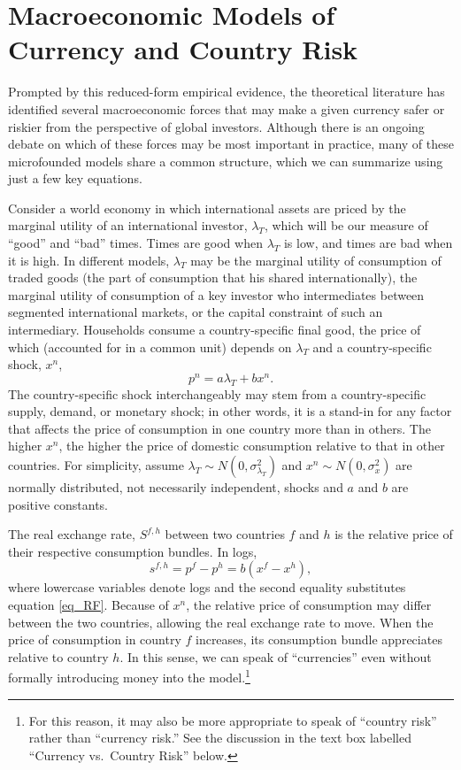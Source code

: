 \documentclass{ar-1col}
\begin{document}
\section{Macroeconomic Models of Currency and Country Risk\label{sec_theory}}

Prompted by this reduced-form empirical evidence, the theoretical literature has identified several macroeconomic forces that may make a given currency safer or riskier from the perspective of global investors. Although there is an ongoing debate on which of these forces may be most important in practice, many of these microfounded models share a common structure, which we can summarize using just a few key equations.

Consider a world economy in which international assets are priced by the marginal utility of an international investor, $\lambda_T$, which will be our measure of ``good'' and ``bad'' times. Times are good when $\lambda_T$ is low, and times are bad when it is high. In different models, $\lambda_T$ may be the marginal utility of consumption of traded goods (the part of consumption that his shared internationally), the marginal utility of consumption of a key investor who intermediates between segmented international markets, or the capital constraint of such an intermediary. Households consume a country-specific final good, the price of which (accounted for in a common unit) depends on $\lambda_T$ and a country-specific shock, $x^n$,
\begin{equation}
  p^{n} = a\lambda_{T} + b x^{n}.  
  \label{eq_RF}
\end{equation}%
The country-specific shock interchangeably may stem from a country-specific supply, demand, or monetary shock; in other words, it is a stand-in for any factor that affects the price of consumption in one country more than in others. The higher $x^{n}$, the higher the price of domestic consumption relative to that in other countries. For simplicity, assume $\lambda _{T}\sim N(0,\sigma^2_{\lambda_{T}})$ and $x^{n} \sim N(0,\sigma^2_x) $ are normally distributed, not necessarily independent, shocks and $a$ and $b$ are positive constants.

The real exchange rate, $S^{f, h}$ between two countries $f$ and $h$ is the relative price of their respective consumption bundles. In logs,
\begin{equation}
  s^{f,h} 
  = p^f - p^h 
  = b(x^f - x^h),
\label{eq_RER}
\end{equation}
where lowercase variables denote logs and the second equality substitutes equation \ref{eq_RF}. Because of $x^{n}$, the relative price of consumption may differ between the two countries, allowing the real exchange rate to move. When the price of consumption in country $f$ increases, its consumption bundle appreciates relative to country $h$. In this sense, we can speak of ``currencies'' even without formally introducing money into the model.\footnote{For this reason, it may also be more appropriate to speak of ``country risk'' rather than ``currency risk.'' See the discussion in the text box labelled ``Currency vs.~Country Risk'' below. }
\end{document}
